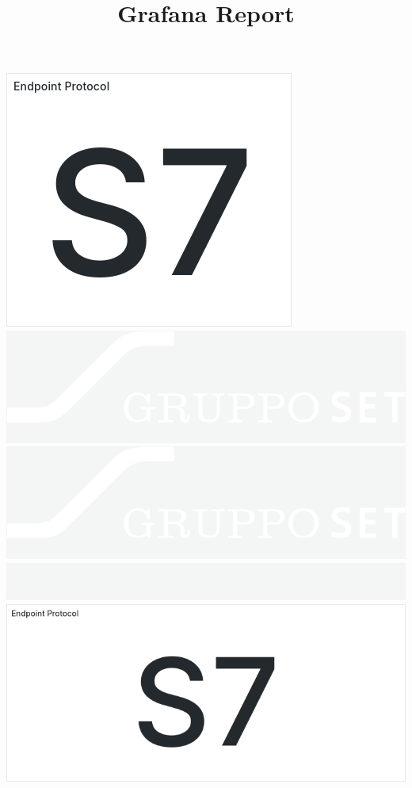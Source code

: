 \documentclass{article}
\begin{document}
\title{Grafana Report}
\author{}
\date{}

\maketitle

\includegraphics[width=\textwidth]{panel_0001-0000.png}
\includegraphics[width=\textwidth]{panel_0001-0008.png}
\includegraphics[width=\textwidth]{panel_0001-0016.png}
\includegraphics[width=\textwidth]{panel_0005-0000.png}
\includegraphics[width=\textwidth]{panel_0009-0000.png}
\end{document}

